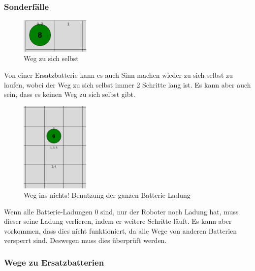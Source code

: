 \documentclass[a4paper,12pt,arial]{scrartcl}
\begin{document}
\subsubsection{Sonderfälle}
\captionsetup[figure]{name=Abb.}
\begin{figure}
    \vspace{-30pt}
    \includegraphics[width=0.3\textwidth]{way_to_self.pdf}
    \caption{Weg zu sich selbst}
    \label{fig:way_to_self}
    \vspace{-40pt}
\end{figure}
\captionsetup[figure]{name=Abbildung}
Von einer Ersatzbatterie kann es auch Sinn machen wieder zu sich selbst zu laufen, wobei der Weg zu sich selbst immer 2 Schritte lang ist. Es kann aber auch sein, dass es keinen Weg zu sich selbst gibt.
\captionsetup[figure]{name=Abb.}
\begin{figure}
    \vspace{-20pt}
    \includegraphics[width=0.3\textwidth]{way_ins_nothing.pdf}
    \caption{Weg ins nichts! Benutzung der ganzen Batterie-Ladung}
    \label{fig:way_to_nothing}
    \vspace{-20pt}
\end{figure}
\captionsetup[figure]{name=Abbildung}

Wenn alle Batterie-Ladungen 0 sind, nur der Roboter noch Ladung hat, muss dieser seine Ladung verlieren, indem er weitere Schritte läuft. Es kann aber vorkommen, dass dies nicht funktioniert, da alle Wege von anderen Batterien versperrt sind. Deswegen muss dies überprüft werden.

\subsubsection{Wege zu Ersatzbatterien}
\end{document}
